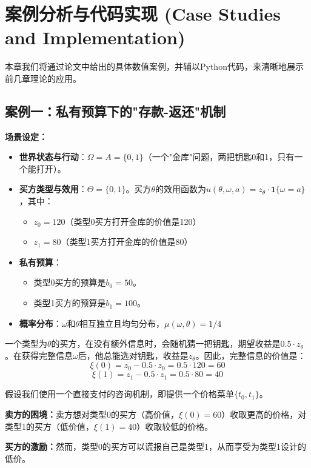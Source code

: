 \section{案例分析与代码实现 (Case Studies and Implementation)}

本章我们将通过论文中给出的具体数值案例，并辅以Python代码，来清晰地展示前几章理论的应用。

\subsection{案例一：私有预算下的"存款-返还"机制}

\textbf{场景设定：}
\begin{itemize}
    \item \textbf{世界状态与行动}：$\Omega=A=\{0,1\}$（一个"金库"问题，两把钥匙0和1，只有一个能打开）。
    \item \textbf{买方类型与效用}：$\Theta=\{0,1\}$。买方$\theta$的效用函数为$u(\theta,\omega,a)=z_{\theta}\cdot \mathbf{1}\{\omega=a\}$，其中：
       \begin{itemize}
          \item $z_0 = 120$（类型0买方打开金库的价值是120）
          \item $z_1= 80$（类型1买方打开金库的价值是80）
       \end{itemize}
    \item \textbf{私有预算}：
       \begin{itemize}
          \item 类型0买方的预算是$b_0 = 50$。
          \item 类型1买方的预算是$b_1 = 100$。
       \end{itemize}
    \item \textbf{概率分布}：$\omega$和$\theta$相互独立且均匀分布，$\mu(\omega,\theta)= 1/4$
\end{itemize}

一个类型为$\theta$的买方，在没有额外信息时，会随机猜一把钥匙，期望收益是$0.5\cdot z_\theta$。在获得完整信息$\omega$后，他总能选对钥匙，收益是$z_\theta$。因此，完整信息的价值是：
$$\xi(0) = z_0 - 0.5 \cdot z_0 = 0.5 \cdot 120 = 60$$
$$\xi(1) = z_1 - 0.5 \cdot z_1 = 0.5 \cdot 80 = 40$$

假设我们使用一个直接支付的咨询机制，即提供一个价格菜单$\{t_0,t_1\}$。

\textbf{卖方的困境：}卖方想对类型0的买方（高价值，$\xi(0)=60$）收取更高的价格，对类型1的买方（低价值，$\xi(1)=40$）收取较低的价格。

\textbf{买方的激励：}然而，类型0的买方可以谎报自己是类型1，从而享受为类型1设计的低价。

